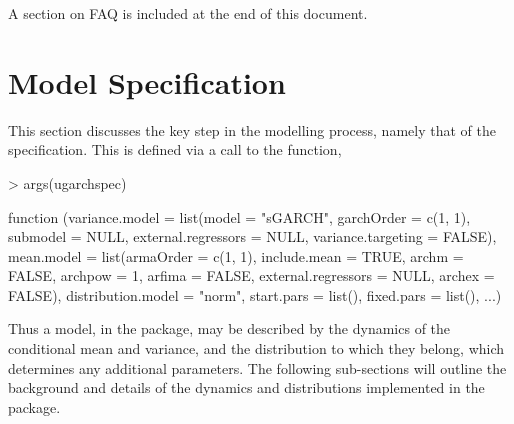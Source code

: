 A section on FAQ is included at the end of this document.
\section{Model Specification}
This section discusses the key step in the modelling process, namely that of the
specification. This is defined via a call to the \verb@ugarchspec@ function,
\begin{Schunk}
\begin{Sinput}
> args(ugarchspec)
\end{Sinput}
\begin{Soutput}
function (variance.model = list(model = "sGARCH", garchOrder = c(1,
    1), submodel = NULL, external.regressors = NULL, variance.targeting = FALSE),
    mean.model = list(armaOrder = c(1, 1), include.mean = TRUE,
        archm = FALSE, archpow = 1, arfima = FALSE, external.regressors = NULL,
        archex = FALSE), distribution.model = "norm", start.pars = list(),
    fixed.pars = list(), ...)
\end{Soutput}
\end{Schunk}
Thus a model, in the \verb@rugarch@ package, may be described by the dynamics of
the conditional mean and variance, and the distribution to which they belong,
which determines any additional parameters. The following sub-sections will
outline the background and details of the dynamics and distributions implemented
in the package.

